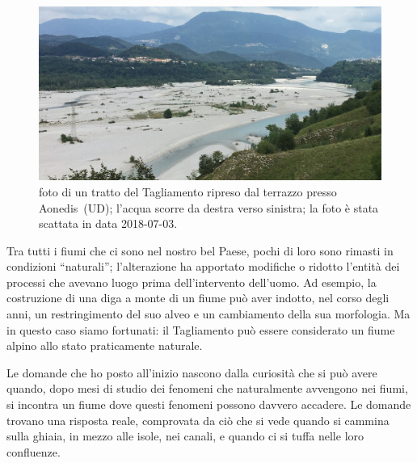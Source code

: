 \begin{figure}
	\centering
	\includegraphics[width=\textwidth]{files/foto_terrazzo_valle_pinzano.jpg}
	\caption[foto di un tratto del Tagliamento ripreso dal terrazzo presso Aonedis~(UD)]{foto di un tratto del Tagliamento ripreso dal terrazzo presso Aonedis~(UD); l'acqua scorre da destra verso sinistra; la foto è stata scattata in data 2018-07-03. 
	}
	\label{fig:foto-pinzano}
\end{figure}


Tra tutti i fiumi che ci sono nel nostro bel Paese, pochi di loro sono rimasti in condizioni “naturali”; l'alterazione ha apportato modifiche o ridotto l'entità dei processi che avevano luogo prima dell'intervento dell'uomo. 
Ad esempio, la costruzione di una diga a monte di un fiume può aver indotto, nel corso degli anni, un restringimento del suo alveo e un cambiamento della sua morfologia.
Ma in questo caso siamo fortunati: il Tagliamento può essere considerato un fiume alpino allo stato praticamente naturale.

Le domande che ho posto all'inizio nascono dalla curiosità che si può avere quando, dopo mesi di studio dei fenomeni che naturalmente avvengono nei fiumi, si incontra un fiume dove questi fenomeni possono davvero accadere. Le domande trovano una risposta reale, comprovata da ciò che si vede quando si cammina sulla ghiaia, in mezzo alle isole, nei canali, e quando ci si tuffa nelle loro confluenze.

